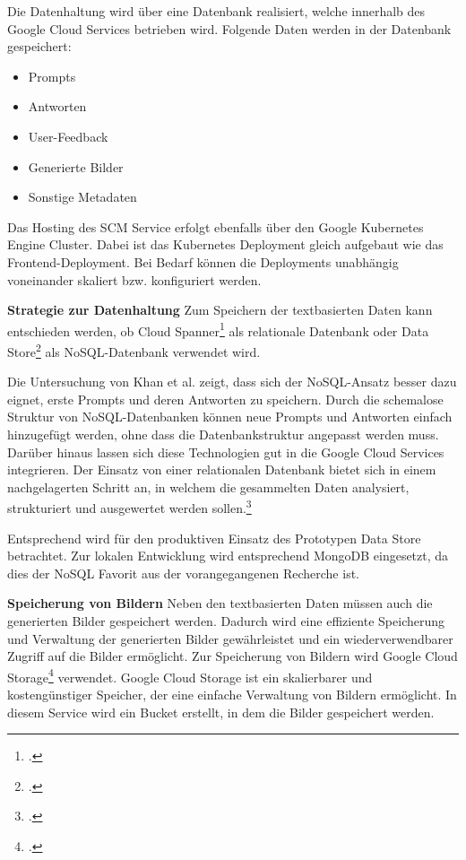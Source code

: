 Die Datenhaltung wird über eine Datenbank realisiert, welche innerhalb des Google Cloud Services betrieben wird.
Folgende Daten werden in der Datenbank gespeichert:
\begin{itemize}
    \item Prompts
    \item Antworten
    \item User-Feedback
    \item Generierte Bilder
    \item Sonstige Metadaten
\end{itemize}

Das Hosting des SCM Service erfolgt ebenfalls über den Google Kubernetes Engine Cluster.
Dabei ist das Kubernetes Deployment gleich aufgebaut wie das Frontend-Deployment.
Bei Bedarf können die Deployments unabhängig voneinander skaliert bzw. konfiguriert werden.

\textbf{Strategie zur Datenhaltung}\newline
Zum Speichern der textbasierten Daten kann entschieden werden, ob Cloud Spanner\footcite{google_spanner} als relationale Datenbank oder Data Store\footcite{google_datastore} als NoSQL-Datenbank verwendet wird.

Die Untersuchung von Khan et al. zeigt, dass sich der NoSQL-Ansatz besser dazu eignet, erste Prompts und deren Antworten zu speichern.
Durch die schemalose Struktur von NoSQL-Datenbanken können neue Prompts und Antworten einfach hinzugefügt werden, ohne dass die Datenbankstruktur angepasst werden muss.
Darüber hinaus lassen sich diese Technologien gut in die Google Cloud Services integrieren.
Der Einsatz von einer relationalen Datenbank bietet sich in einem nachgelagerten Schritt an, in welchem die gesammelten Daten analysiert, strukturiert und ausgewertet werden sollen.\footcite{Khan2022SQL}

Entsprechend wird für den produktiven Einsatz des Prototypen Data Store betrachtet.
Zur lokalen Entwicklung wird entsprechend MongoDB eingesetzt, da dies der NoSQL Favorit aus der vorangegangenen Recherche ist.

\textbf{Speicherung von Bildern}\newline
Neben den textbasierten Daten müssen auch die generierten Bilder gespeichert werden.
Dadurch wird eine effiziente Speicherung und Verwaltung der generierten Bilder gewährleistet und ein wiederverwendbarer Zugriff auf die Bilder ermöglicht.
Zur Speicherung von Bildern wird Google Cloud Storage\footcite{google_storage} verwendet.
Google Cloud Storage ist ein skalierbarer und kostengünstiger Speicher, der eine einfache Verwaltung von Bildern ermöglicht.
In diesem Service wird ein Bucket erstellt, in dem die Bilder gespeichert werden.

